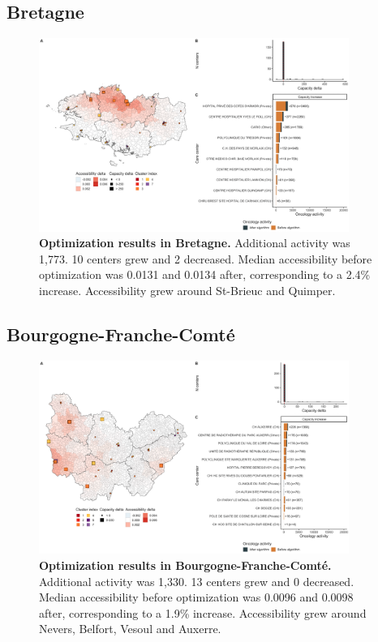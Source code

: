 \subsection*{Bretagne}

\begin{figure}[H]
    \includegraphics[width=0.9\textwidth]{images/camion/optim_region/optim_Bretagne.png}
    \centering
    \caption{ \textbf{Optimization results in Bretagne.} Additional activity was
        1,773. 10 centers grew and 2 decreased. Median accessibility before
        optimization was 0.0131 and 0.0134 after, corresponding to a 2.4\%
        increase. Accessibility grew around St-Brieuc and Quimper. }
\end{figure}

\subsection*{Bourgogne-Franche-Comté}

\begin{figure}[H]
    \includegraphics[width=0.9\textwidth]{images/camion/optim_region/optim_Bourgogne-Franche-Comte.png}
    \centering
    \caption{ \textbf{Optimization results in Bourgogne-Franche-Comté.}
        Additional activity was 1,330. 13 centers grew and 0 decreased. Median
        accessibility before optimization was 0.0096 and 0.0098 after,
        corresponding to a 1.9\% increase. Accessibility grew around Nevers,
        Belfort, Vesoul and Auxerre. }
\end{figure}

